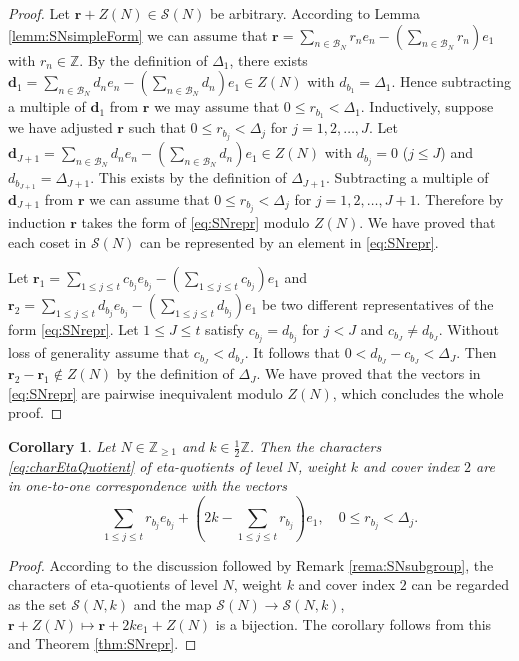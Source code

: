 \documentclass[12pt]{amsart}
\numberwithin{equation}{section}
\theoremstyle{plain}
\newtheorem{coro}[thm]{Corollary}
\theoremstyle{definition}
\theoremstyle{remark}
\newcommand\numZ{\mathbb{Z}}
\newcommand\numgeq[2]{\mathbb{#1}_{\geq #2}}
\begin{document}
\begin{proof}
Let $\mathbf{r}+Z(N)\in\mathscr{S}(N)$ be arbitrary. According to Lemma \ref{lemm:SNsimpleForm} we can assume that $\mathbf{r}=\sum_{n\in\mathscr{B}_N}r_ne_n-\left(\sum_{n\in\mathscr{B}_N}r_n\right)e_1$ with $r_n\in\numZ$. By the definition of $\Delta_1$, there exists $\mathbf{d}_1=\sum_{n\in\mathscr{B}_N}d_ne_n-\left(\sum_{n\in\mathscr{B}_N}d_n\right)e_1\in Z(N)$ with $d_{b_1}=\Delta_1$. Hence subtracting a multiple of $\mathbf{d}_1$ from $\mathbf{r}$ we may assume that $0\leq r_{b_1}<\Delta_1$. Inductively, suppose we have adjusted $\mathbf{r}$ such that $0\leq r_{b_j}<\Delta_j$ for $j=1,2,\dots,J$. Let $\mathbf{d}_{J+1}=\sum_{n\in\mathscr{B}_N}d_ne_n-\left(\sum_{n\in\mathscr{B}_N}d_n\right)e_1\in Z(N)$ with $d_{b_j}=0$ ($j\leq J$) and $d_{b_{J+1}}=\Delta_{J+1}$. This exists by the definition of $\Delta_{J+1}$. Subtracting a multiple of $\mathbf{d}_{J+1}$ from $\mathbf{r}$ we can assume that $0\leq r_{b_j}<\Delta_j$ for $j=1,2,\dots,J+1$. Therefore by induction $\mathbf{r}$ takes the form of \eqref{eq:SNrepr} modulo $Z(N)$. We have proved that each coset in $\mathscr{S}(N)$ can be represented by an element in \eqref{eq:SNrepr}.

Let $\mathbf{r}_1=\sum_{1\leq j\leq t}c_{b_j}e_{b_j}-\left(\sum_{1\leq j\leq t}c_{b_j}\right)e_1$ and $\mathbf{r}_2=\sum_{1\leq j\leq t}d_{b_j}e_{b_j}-\left(\sum_{1\leq j\leq t}d_{b_j}\right)e_1$ be two different representatives of the form \eqref{eq:SNrepr}. Let $1\leq J \leq t$ satisfy $c_{b_j}=d_{b_j}$ for $j<J$ and $c_{b_J}\neq d_{b_J}$. Without loss of generality assume that $c_{b_J}<d_{b_J}$. It follows that $0<d_{b_J}-c_{b_J}<\Delta_J$. Then $\mathbf{r}_2-\mathbf{r}_1\not\in Z(N)$ by the definition of $\Delta_J$. We have proved that the vectors in \eqref{eq:SNrepr} are pairwise inequivalent modulo $Z(N)$, which concludes the whole proof.
\end{proof}
\begin{coro}
\label{coro:AllEtaQuoChars}
Let $N\in\numgeq{Z}{1}$ and $k\in\frac{1}{2}\numZ$. Then the characters \eqref{eq:charEtaQuotient} of eta-quotients of level $N$, weight $k$ and cover index $2$ are in one-to-one correspondence with the vectors
\begin{equation*}
\sum_{1\leq j\leq t}r_{b_j}e_{b_j}+\left(2k-\sum_{1\leq j\leq t}r_{b_j}\right)e_1,\quad 0\leq r_{b_j}<\Delta_j.
\end{equation*}
\end{coro}
\begin{proof}
According to the discussion followed by Remark \ref{rema:SNsubgroup}, the characters of eta-quotients of level $N$, weight $k$ and cover index $2$ can be regarded as the set $\mathscr{S}(N,k)$ and the map $\mathscr{S}(N)\to\mathscr{S}(N,k)$, $\mathbf{r}+Z(N)\mapsto\mathbf{r}+2ke_1+Z(N)$ is a bijection. The corollary follows from this and Theorem \ref{thm:SNrepr}.
\end{proof}
\end{document}
